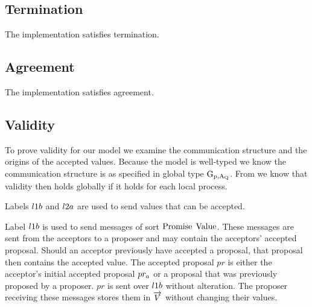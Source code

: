 \subsection{Termination}
The implementation satisfies termination.

\subsection{Agreement}
The implementation satisfies agreement.

\subsection{Validity}
To prove validity for our model we examine the communication structure and the origins of the accepted values.
Because the model is well-typed we know the communication structure is as specified in global type $\operatorname{G_{p, A_Q}}$.
From \cite{ftmpst} we know that validity then holds globally if it holds for each local process.

Labels $l1b$ and $l2a$ are used to send values that can be accepted.

Label $l1b$ is used to send messages of sort $\operatorname{Promise}\; \operatorname{Value}$.
These messages are sent from the acceptors to a proposer and may contain the acceptors' accepted proposal.
Should an acceptor previously have accepted a proposal, that proposal then contains the accepted value.
The accepted proposal $pr$ is either the acceptor's initial accepted proposal $pr_{a}$ or a proposal that was previously proposed by a proposer.
$pr$ is sent over $l1b$ without alteration.
The proposer receiving these messages stores them in $\overrightarrow{V}$ without changing their values.

